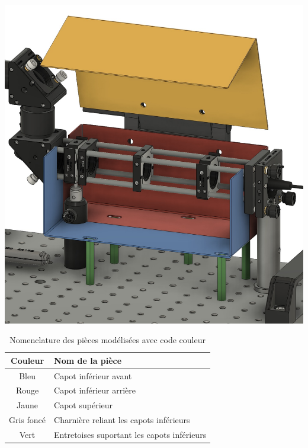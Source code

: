\begin{minipage}[c]{0.48\textwidth}
    \begin{center}
        \includegraphics[width=\textwidth]{assets/figures/Protections_laser/Securite_mecanique/Protection_entree_laser/model_3D_ouvert.jpeg}
    \end{center}
    \label{model_3D_ouvert}
\end{minipage}

\begin{table}[H]
    \centering
    \caption{Nomenclature des pièces modélisées avec code couleur}
    \begin{tabular}{|c|l|}
        \hline
        \textbf{Couleur}                           & \textbf{Nom de la pièce}                    \\
        \hline
        \textcolor[RGB]{88, 122, 163}{Bleu}        & Capot inférieur avant                       \\
        \textcolor[RGB]{170, 80, 70}{Rouge}        & Capot inférieur arrière                     \\
        \textcolor[RGB]{233, 173, 56}{Jaune}       & Capot supérieur                             \\
        \textcolor[RGB]{100, 100, 100}{Gris foncé} & Charnière reliant les capots inférieurs     \\
        \textcolor[RGB]{70, 170, 70}{Vert}         & Entretoises suportant les capots inférieurs \\
        \hline
    \end{tabular}
    \label{tab:nomenclature_pieces}
\end{table}

